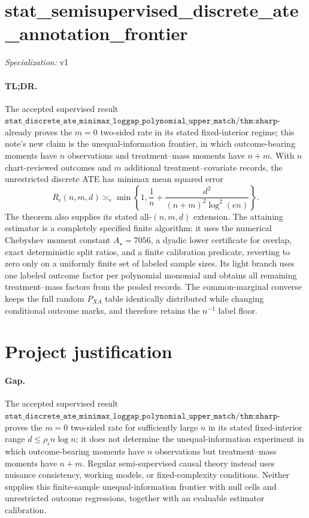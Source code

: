 \documentclass{article}
\begin{document}
\sloppy

\section*{stat\_\allowbreak{}semisupervised\_\allowbreak{}discrete\_\allowbreak{}ate\_\allowbreak{}annotation\_\allowbreak{}frontier}

\noindent\textit{Specialization:} v1\par

\paragraph{TL;DR.} The accepted supervised result \(\texttt{stat\_discrete\_ate\_minimax\_loggap\_polynomial\_upper\_match/thm:sharp-minimax-fixed-interior}\) already proves the \(m=0\) two-sided rate in its stated fixed-interior regime; this note's new claim is the unequal-information frontier, in which outcome-bearing moments have \(n\) observations and treatment--mass moments have \(n+m\).  With \(n\) chart-reviewed outcomes and \(m\) additional treatment--covariate records, the unrestricted discrete ATE has minimax mean squared error
\[
 R_\epsilon(n,m,d)\asymp_\epsilon
 \min\!\left\{1,\frac1n+\frac{d^2}{(n+m)^2\log^2(en)}\right\}.
\]
The theorem also supplies its stated all-\((n,m,d)\) extension.  The attaining estimator is a completely specified finite algorithm: it uses the numerical Chebyshev moment constant \(A_\star=7056\), a dyadic lower certificate for overlap, exact deterministic split ratios, and a finite calibration predicate, reverting to zero only on a uniformly finite set of labeled sample sizes.  Its light branch uses one labeled outcome factor per polynomial monomial and obtains all remaining treatment--mass factors from the pooled records.  The common-marginal converse keeps the full random \(P_{XA}\) table identically distributed while changing conditional outcome marks, and therefore retains the \(n^{-1}\) label floor.

\section{Project justification}

\paragraph{Gap.} The accepted supervised result \(\texttt{stat\_discrete\_ate\_minimax\_loggap\_polynomial\_upper\_match/thm:sharp-minimax-fixed-interior}\) proves the \(m=0\) two-sided rate for sufficiently large \(n\) in its stated fixed-interior range \(d\le\rho_\epsilon n\log n\); it does not determine the unequal-information experiment in which outcome-bearing moments have \(n\) observations but treatment--mass moments have \(n+m\).  Regular semi-supervised causal theory instead uses nuisance consistency, working models, or fixed-complexity conditions.  Neither supplies this finite-sample unequal-information frontier with null cells and unrestricted outcome regressions, together with an evaluable estimator calibration.
\end{document}
